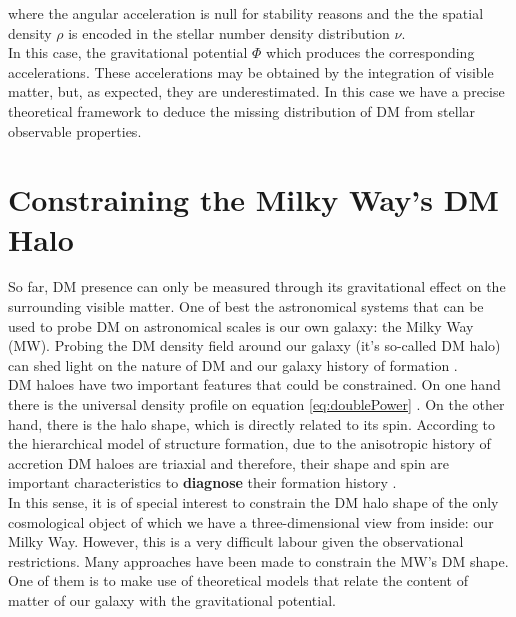 where the angular acceleration is null for stability reasons and the the spatial density $\rho$ is encoded in the stellar number density distribution $\nu$.\\

In this case, the gravitational potential $\Phi$ which produces the corresponding accelerations. These accelerations may be obtained by the integration of visible matter, but, as expected, they are underestimated. In this case we have a precise theoretical framework to deduce the missing distribution of DM from stellar observable properties.\\


\section{Constraining the Milky Way's DM Halo}
So far, DM presence can only be measured through its gravitational effect on the surrounding visible matter. 
One of best the astronomical systems that can be used to probe DM on astronomical scales is our own galaxy: the Milky Way (MW).
Probing the DM density field around our galaxy (it's so-called DM halo) can shed light on the nature of DM \cite{Read_and_Moore_2005,Nipoti_et_al._2007} and our
galaxy history of formation \cite{Read_et_al._2008,Read_et_al._2009,Vera-Ciro_et_al._2011}.\\

DM haloes have two important features that could be constrained. 
On one hand there is the universal density profile on equation \eqref{eq:doublePower} \cite{Navarro_et_al._2010}. 
On the other hand, there is the halo shape, which is directly related to its spin. 
According to the hierarchical model of structure formation, due to the anisotropic history of accretion DM haloes are triaxial and therefore, their shape and spin are important characteristics to \textbf{diagnose} their formation history \cite{Bardeen_1986,Vera-Ciro_and_Helmi_2013}.\\

In this sense, it is of special interest to constrain the DM halo shape of the only cosmological object of which we have a three-dimensional view from inside: our Milky Way. However, this is a very difficult labour given the observational restrictions. Many approaches have been made to constrain the MW's DM shape. One of them is to make use of theoretical models that relate the content of matter of our galaxy with the gravitational potential.\\

